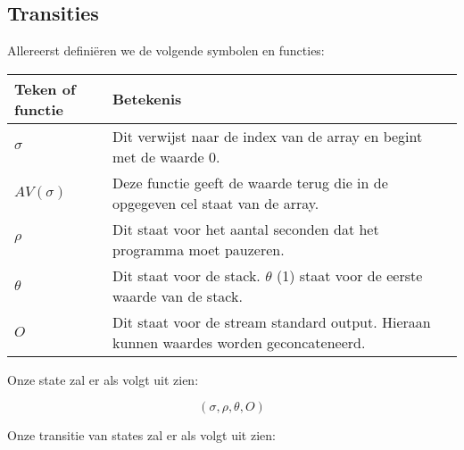 \documentclass[11pt]{article}
\begin{document}
\subsection{Transities}
Allereerst defini\"eren we de volgende symbolen en functies:
\newline
\newline
\begin{tabular}{ | l | p{12cm} |}
    \hline
    Teken of functie & Betekenis \\ \hline
    \begin{math} \sigma \end{math} &  Dit verwijst naar de index van de array en begint met de waarde 0. \\ \hline
    \begin{math} AV(\sigma) \end{math} & Deze functie geeft de waarde terug die in de opgegeven cel staat van de array. \\ \hline
    \begin{math} \rho \end{math} &  Dit staat voor het aantal seconden dat het programma moet pauzeren. \\ \hline
    \begin{math} \theta \end{math} &  Dit staat voor de stack. \begin{math}\theta\end{math} (1) staat voor de eerste waarde van de stack. \\ \hline
    \begin{math} O \end{math} &  Dit staat voor de stream standard output. Hieraan kunnen waardes worden geconcateneerd. \\ \hline

\end{tabular}
\newline
\newline
\newline

Onze state zal er als volgt uit zien:

\[
(\sigma, \rho, \theta, O)
\]

Onze transitie van states zal er als volgt uit zien:

\begin{prooftree}
\end{prooftree}
\end{document}
